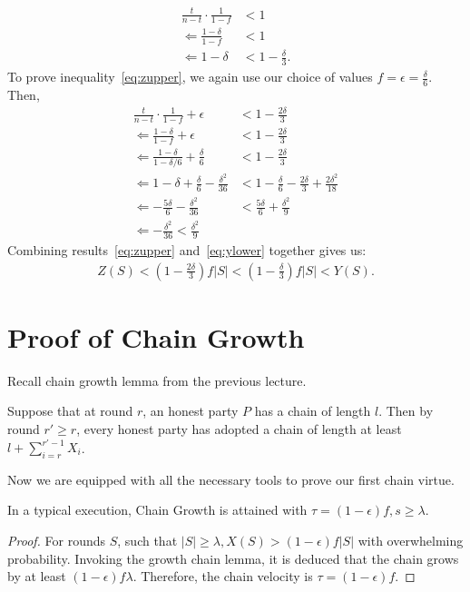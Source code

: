 \begin{align}
\frac{t}{n-t}\cdot\frac{1}{1-f} &< 1\\
\Leftarrow \frac{1-\delta}{1-f} &< 1\\
\Leftarrow 1-\delta &< 1 -\frac{\delta}{3}.
\end{align}
To prove inequality~\ref{eq:zupper}, we again use our choice of values $f = \epsilon = \frac{\delta}{6}$. Then,
\begin{align}
    \frac{t}{n-t}\cdot\frac{1}{1-f} + \epsilon &< 1 - \frac{2\delta}{3}\\
    \Leftarrow \frac{1-\delta}{1-f} + \epsilon &< 1-\frac{2\delta}{3}\\
    \Leftarrow \frac{1-\delta}{1-\delta/6} + \frac{\delta}{6} &< 1 - \frac{2\delta}{3}\\
    \Leftarrow 1-\delta + \frac{\delta}{6} -\frac{\delta^2}{36} &< 1- \frac{\delta}{6} -\frac{2\delta}{3} + \frac{2\delta^2}{18}\\
    \Leftarrow -\frac{5\delta}{6}-\frac{\delta^2}{36} &< \frac{5\delta}{6} + \frac{\delta^2}{9}\\
    \Leftarrow -\frac{\delta^2}{36} < \frac{\delta^2}{9}
\end{align}
Combining results~\ref{eq:zupper} and~\ref{eq:ylower} together gives us:
\begin{align}
Z(S) < \left(1 - \frac{2\delta}{3}\right)f|S| <  \left(1 - \frac{\delta}{3}\right)f|S| <
Y(S).
\end{align}

\section{Proof of Chain Growth}
Recall chain growth lemma from the previous lecture.
\begin {lemma}
    Suppose that at round $r$, an honest party $P$ has a chain of length $l$. Then by round $r' \geq r$, every honest party has adopted a chain of length at least $l + \sum_{i=r}^{r'-1} X_i$.
\end {lemma}
Now we are equipped with all the necessary tools to prove our first chain virtue.
\begin{theorem}
In a typical execution, Chain Growth is attained with $\tau = (1-\epsilon)f, s \geq \lambda$.
\end{theorem}

\begin{proof}
For rounds $S$, such that $|S| \geq \lambda, X(S) > (1-\epsilon)f|S|$ with overwhelming probability. Invoking the growth chain lemma, it is deduced that the chain grows by at least $(1-\epsilon)f\lambda$. Therefore, the chain velocity is $\tau = (1-\epsilon)f$.
\end{proof}


